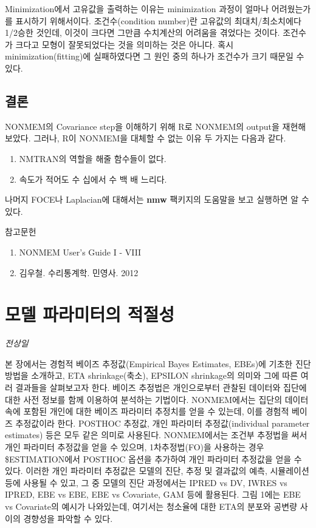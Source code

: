 \documentclass[
  10pt,
]{krantz}
\providecommand{\tightlist}{%
  \setlength{\itemsep}{0pt}\setlength{\parskip}{0pt}}
\begin{document}
Minimization에서 고유값을 출력하는 이유는 minimization 과정이 얼마나 어려웠는가를 표시하기 위해서이다.
조건수(condition number)란 고유값의 최대치/최소치에다 1/2승한 것인데, 이것이 크다면 그만큼 수치계산의
어려움을 겪었다는 것이다. 조건수가 크다고 모형이 잘못되었다는 것을 의미하는 것은 아니다. 혹시
minimization(fitting)에 실패하였다면 그 원인 중의 하나가 조건수가 크기 때문일 수 있다.

\hypertarget{uxacb0uxb860}{%
\section{결론}\label{uxacb0uxb860}}

NONMEM의 Covariance step을 이해하기 위해 R로 NONMEM의 output을 재현해 보았다. 그러나, R이
NONMEM을 대체할 수 없는 이유 두 가지는 다음과 같다.

\begin{enumerate}
\def\labelenumi{\arabic{enumi}.}
\tightlist
\item
  NMTRAN의 역할을 해줄 함수들이 없다.
\item
  속도가 적어도 수 십에서 수 백 배 느리다.
\end{enumerate}

나머지 FOCE나 Laplacian에 대해서는 \textbf{nmw} 팩키지의 도움말을 보고 실행하면 알 수 있다.

참고문헌

\begin{enumerate}
\def\labelenumi{\arabic{enumi}.}
\tightlist
\item
  NONMEM User's Guide I - VIII
\item
  김우철. 수리통계학. 민영사. 2012
\end{enumerate}

\hypertarget{uxbaa8uxb378-uxd30cuxb77cuxbbf8uxd130uxc758-uxc801uxc808uxc131}{%
\chapter{모델 파라미터의 적절성}\label{uxbaa8uxb378-uxd30cuxb77cuxbbf8uxd130uxc758-uxc801uxc808uxc131}}

\emph{전상일}

본 장에서는 경험적 베이즈 추정값(Empirical Bayes Estimates, EBEs)에 기초한 진단 방법을 소개하고,
ETA shrinkage(축소), EPSILON shrinkage의 의미와 그에 따른 여러 결과들을 살펴보고자 한다. 베이즈
추정법은 개인으로부터 관찰된 데이터와 집단에 대한 사전 정보를 함께 이용하여 분석하는 기법이다. NONMEM에서는
집단의 데이터 속에 포함된 개인에 대한 베이즈 파라미터 추정치를 얻을 수 있는데, 이를 경험적 베이즈 추정값이라 한다.
POSTHOC 추정값, 개인 파라미터 추정값(individual parameter estimates) 등은 모두 같은 의미로
사용된다. NONMEM에서는 조건부 추정법을 써서 개인 파라미터 추정값을 얻을 수 있으며, 1차추정법(FO)을 사용하는
경우 \$ESTIMATION에서 POSTHOC 옵션을 추가하여 개인 파라미터 추정값을 얻을 수 있다. 이러한 개인 파라미터 추정값은
모델의 진단, 추정 및 결과값의 예측, 시뮬레이션 등에 사용될 수 있고, 그 중 모델의 진단 과정에서는 IPRED vs DV,
IWRES vs IPRED, EBE vs EBE, EBE vs Covariate, GAM 등에 활용된다. 그림 1에는 EBE vs
Covariate의 예시가 나와있는데, 여기서는 청소율에 대한 ETA의 분포와 공변량 사이의 경향성을 파악할 수 있다.
\end{document}
